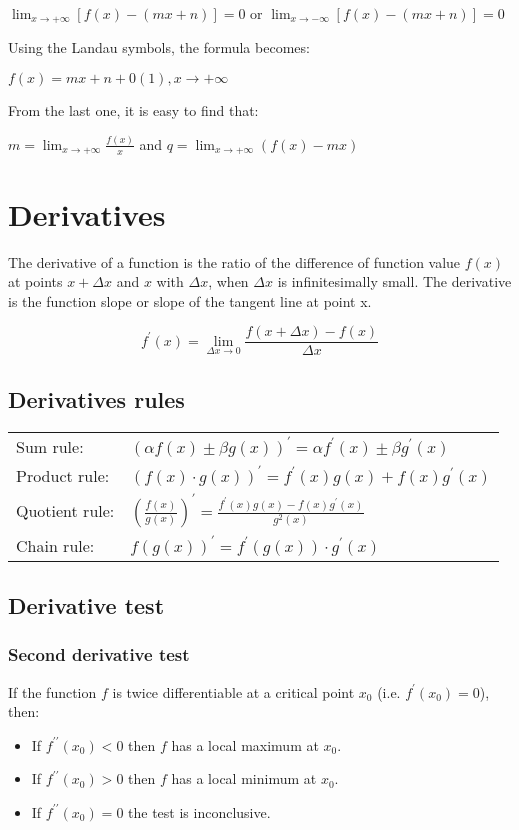 $\displaystyle \lim_{x\rightarrow +\infty} \left[ f(x) - (mx+n) \right] = 0 $ or 
$\displaystyle \lim_{x\rightarrow -\infty} \left[ f(x) - (mx+n) \right] = 0 $

Using the Landau symbols, the formula becomes:

$\displaystyle  f(x) = mx + n + 0(1), x\rightarrow +\infty$ 

From the last one, it is easy to find that:

$\displaystyle m=\lim_{x\rightarrow +\infty} \frac{f(x)}{x} $  and $\displaystyle q=\lim_{x\rightarrow +\infty} (f(x) - mx) $

\section{Derivatives}
The derivative of a function is the ratio of the difference of function value $ f(x) $ at points $ x+\Delta x $ and $ x $ with $ \Delta x $, when $ \Delta x $ is infinitesimally small. The derivative is the function slope or slope of the tangent line at point x.

\[
f^\prime(x) = \lim_{\Delta x \rightarrow 0} \frac{ f( x + \Delta x ) - f(x) }{\Delta x}
\]

\subsection{Derivatives rules}
\begin{tabular}{ l l }
Sum rule:      & $ \displaystyle (\alpha f(x) \pm \beta g(x) )^\prime = \alpha f^\prime(x) \pm \beta g^\prime(x) $  \\
Product rule:  & $ \displaystyle (f(x) \cdot g(x) )^\prime = f^\prime(x) g(x) + f(x) g^\prime(x) $ \\
Quotient rule: & $ \displaystyle \left( \frac{f(x)}{g(x)} \right)^\prime = \frac{ f^\prime(x) g(x) - f(x) g^\prime(x) }{ g^2(x) } $ \\
Chain rule:    & $ \displaystyle f\left( g(x) \right) ^\prime = f^\prime\left( g(x) \right) \cdot g^\prime(x) $
\end{tabular}

\subsection{Derivative test}

\subsubsection{Second derivative test}
If the function $f$ is twice differentiable at a critical point $x_0$ (i.e. $f^\prime(x_0) = 0$), then:
\begin{itemize}
\item If $ f^{\prime \prime }(x_0)<0 $ then $f$  has a local maximum at $x_0$.
\item If $ f^{\prime \prime }(x_0)>0 $ then $f$  has a local minimum at $x_0$.
\item If $ f^{\prime \prime }(x_0)=0 $ the test is inconclusive.
\end{itemize}

